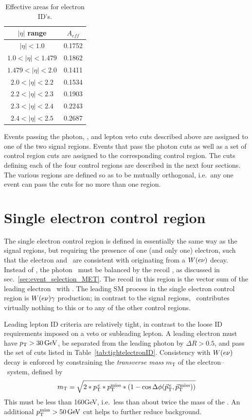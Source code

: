 \begin{table}
\centering
\begin{tabular}{ cc }
\hline
$|\eta|$ range & $A_{eff}$ \\
\hline
$|\eta| < 1.0$ & 0.1752 \\
$1.0 < |\eta| < 1.479$ & 0.1862 \\
$1.479 < |\eta| < 2.0$ & 0.1411 \\
$2.0 < |\eta| < 2.2$ & 0.1534 \\
$2.2 < |\eta| < 2.3$ & 0.1903 \\
$2.3 < |\eta| < 2.4$ & 0.2243 \\
$2.4 < |\eta| < 2.5$ & 0.2687 \\
\hline
\end{tabular}
\caption{Effective areas for electron ID's.}
\label{tab:electron_effective_areas}
\end{table}

Events passing the photon, \MET, and lepton veto cuts described above are assigned to one of the two signal regions. Events that pass the photon
cuts as well as a set of control region cuts are assigned to the corresponding control region. The cuts defining each of the four control regions
are described in the next four sections. The various regions are defined so as to be mutually orthogonal, i.e.\ any one event can pass the cuts
for no more than one region.

\section{Single electron control region} \label{sec:event_selection_monoele}
The single electron control region is defined in essentially the same way as the signal regions, but requiring the presence of one (and only one) electron,
such that the electron and \vecMET\ are consistent with originating from a $\PW(\Pe\Pn)$ decay.
Instead of \vecMET, the photon \vecpT\ must be balanced by the recoil \vecrecoil, as discussed in sec.~\ref{sec:event_selection_MET}. The recoil in this
region is the vector sum of the leading electron \pT\ with \vecMET.
The leading SM process in the single electron control region is $\PW(\Pe\Pn)\Pgamma$ production; in contrast to the signal regions, \zinvg\ contributes
virtually nothing to this or to any of the other control regions.

Leading lepton ID criteria are relatively tight, in contrast to the loose ID requirements imposed on a veto or subleading lepton. A leading electron must have $\pT > 30\unit{GeV}$,
be separated from the leading photon by $\Delta R > 0.5$, and pass the set of cuts listed in Table~\ref{tab:tightelectronID}.
Consistency with $\PW(\Pe\Pn)$ decay is enforced by constraining the \textit{transverse mass} $m_\mathrm{T}$ of the electron--\MET\ system, defined by
\begin{equation}
m_\mathrm{T} = \sqrt{2*\pT^{\,\Pe}*\MET*(1 - \cos{\Delta\phi(\vecpT^{\,\Pe}, \vecMET)})}
\label{eq:mT}
\end{equation}
This must be less than 160\unit{GeV}, i.e.\ less than about twice the mass of the \PW. An additional $\MET > 50\unit{GeV}$ cut helps to further reduce background.

